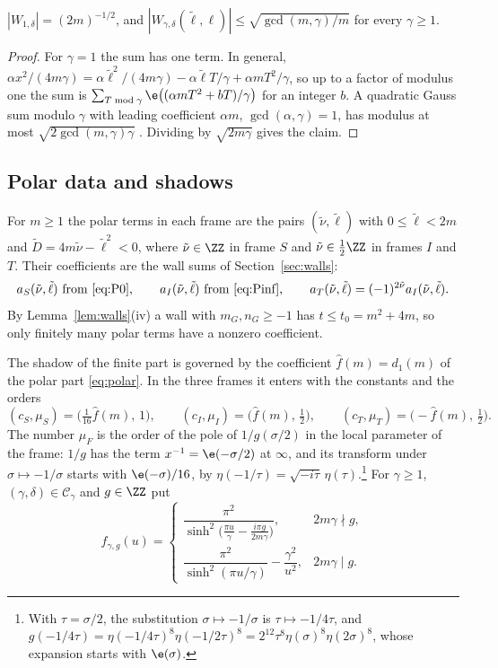 \begin{lemma}\label{lem:weilbound}
$|W_{1,\delta}|=(2m)^{-1/2}$, and $|W_{\gamma,\delta}(\tilde\ell,\ell)|\le\sqrt{\gcd(m,\gamma)/m}$ for every $\gamma\ge1$.
\end{lemma}

\begin{proof}
For $\gamma=1$ the sum has one term. In general, $\alpha x^2/(4m\gamma)=\alpha\tilde\ell^2/(4m\gamma)-\alpha\tilde\ell T/\gamma+\alpha mT^2/\gamma$, so up to a factor of modulus one the sum is $\sum_{T\bmod\gamma}\e\big((\alpha mT^2+bT)/\gamma\big)$ for an integer $b$. A quadratic Gauss sum modulo $\gamma$ with leading coefficient $\alpha m$, $\gcd(\alpha,\gamma)=1$, has modulus at most $\sqrt{2\gcd(m,\gamma)\gamma}$ \cite[Chapter~1]{BEW98}. Dividing by $\sqrt{2m\gamma}$ gives the claim.
\end{proof}

\subsection{Polar data and shadows}
For $m\ge1$ the polar terms in each frame are the pairs $(\tilde\nu,\tilde\ell)$ with $0\le\tilde\ell<2m$ and $\tilde D=4m\tilde\nu-\tilde\ell^2<0$, where $\tilde\nu\in\ZZ$ in frame $S$ and $\tilde\nu\in\frac12\ZZ$ in frames $I$ and $T$. Their coefficients are the wall sums of Section~\ref{sec:walls}:
\begin{equation}\label{eq:polardata}
a_S(\tilde\nu,\tilde\ell)\ \text{from \eqref{eq:P0}},\qquad a_I(\tilde\nu,\tilde\ell)\ \text{from \eqref{eq:Pinf}},\qquad a_T(\tilde\nu,\tilde\ell)=(-1)^{2\tilde\nu}a_I(\tilde\nu,\tilde\ell).
\end{equation}
By Lemma~\ref{lem:walls}(iv) a wall with $m_G,n_G\ge-1$ has $t\le t_0=m^2+4m$, so only finitely many polar terms have a nonzero coefficient.

The shadow of the finite part is governed by the coefficient $\hat f(m)=d_1(m)$ of the polar part \eqref{eq:polar}. In the three frames it enters with the constants and the orders
\begin{equation}\label{eq:mockdata}
(c_S,\mu_S)=\big(\tfrac{1}{16}\hat f(m),\,1\big),\qquad (c_I,\mu_I)=\big(\hat f(m),\,\tfrac12\big),\qquad (c_T,\mu_T)=\big(-\hat f(m),\,\tfrac12\big).
\end{equation}
The number $\mu_F$ is the order of the pole of $1/g(\sigma/2)$ in the local parameter of the frame: $1/g$ has the term $x^{-1}=\e(-\sigma/2)$ at $\infty$, and its transform under $\sigma\mapsto-1/\sigma$ starts with $\e(-\sigma)/16$, by $\eta(-1/\tau)=\sqrt{-i\tau}\,\eta(\tau)$.\footnote{With $\tau=\sigma/2$, the substitution $\sigma\mapsto-1/\sigma$ is $\tau\mapsto-1/4\tau$, and $g(-1/4\tau)=\eta(-1/4\tau)^8\eta(-1/2\tau)^8=2^{12}\tau^8\eta(\sigma)^8\eta(2\sigma)^8$, whose expansion starts with $\e(\sigma)$.} For $\gamma\ge1$, $(\gamma,\delta)\in\mathcal C_\gamma$ and $g\in\ZZ$ put
\[
f_{\gamma,g}(u)=\begin{cases}\dfrac{\pi^2}{\sinh^2\!\big(\frac{\pi u}{\gamma}-\frac{i\pi g}{2m\gamma}\big)},& 2m\gamma\nmid g,\\[2.2ex]
\dfrac{\pi^2}{\sinh^2(\pi u/\gamma)}-\dfrac{\gamma^2}{u^2},& 2m\gamma\mid g.\end{cases}
\]

